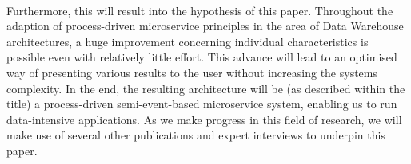 \\
Furthermore, this will result into the hypothesis of this paper. Throughout the adaption of process-driven microservice principles in the area of Data Warehouse architectures, a huge improvement concerning individual characteristics is possible even with relatively little effort. This advance will lead to an optimised way of presenting various results to the user without increasing the systems complexity.\newline 
In the end, the resulting architecture will be (as described within the title) a process-driven semi-event-based microservice system, enabling us to run data-intensive applications. \newline
As we make progress in this field of research, we will make use of several other publications and expert interviews to underpin this paper. 